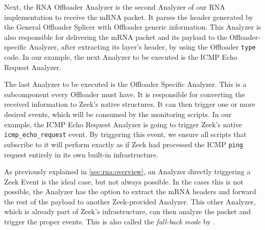 
Next, the RNA Offloader Analyzer is the second Analyzer of our RNA implementation to receive the mRNA packet. It parses the header generated by the General Offloader Splicer with Offloader generic information. This Analyzer is also responsible for delivering the mRNA packet and its payload to the Offloader-specific Analyzer, after extracting its layer's header, by using the Offloader \texttt{type} code. In our example, the next Analyzer to be executed is the ICMP Echo Request Analyzer.

The last Analyzer to be executed is the Offloader Specific Analyzer. This is a subcomponent every Offloader must have. It is responsible for converting the received information to Zeek's native structures. It can then trigger one or more desired events, which will be consumed by the monitoring scripts. In our example, the ICMP Echo Request Analyzer is going to trigger Zeek's native \texttt{icmp\_echo\_request} event. By triggering this event, we ensure all scripts that subscribe to it will perform exactly as if Zeek had processed the ICMP \texttt{ping} request entirely in its own built-in infrastructure.

As previously explained in \autoref{sec:rna:overview}, an Analyzer directly triggering a Zeek Event is the ideal case, but not always possible. In the cases this is not possible, the Analyzer has the option to extract the mRNA headers and forward the rest of the payload to another Zeek-provided Analyzer. This other Analyzer, which is already part of Zeek's infrastructure, can then analyze the packet and trigger the proper events. This is also called the \textit{fall-back mode} by .
